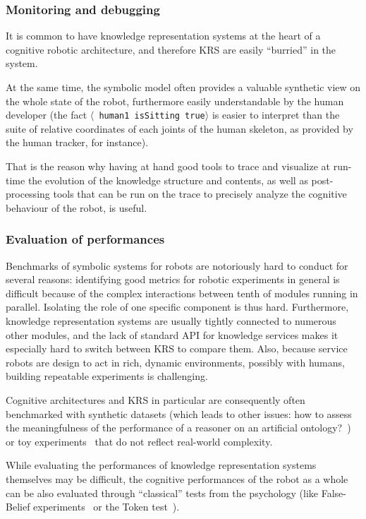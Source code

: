 \documentclass[a4paper, twocolumn]{article}
\newcommand{\stmt}[1]{{\footnotesize \tt $\langle$ #1\relax$\rangle$}}
\begin{document}
\subsubsection{Monitoring and debugging}
\label{sect|debugging}

It is common to have knowledge representation systems at the heart of a
cognitive robotic architecture, and therefore KRS are easily ``burried'' in the
system.

At the same time, the symbolic model often provides a valuable synthetic view
on the whole state of the robot, furthermore easily understandable by the human
developer (the fact \stmt{human1 isSitting true} is easier to interpret than
the suite of relative coordinates of each joints of the human skeleton, as
provided by the human tracker, for instance).

That is the reason why having at hand good tools to trace and visualize at
run-time the evolution of the knowledge structure and contents, as well as
post-processing tools that can be run on the trace to precisely analyze the
cognitive behaviour of the robot, is useful.

\subsubsection{Evaluation of performances}
\label{sect|performances}

Benchmarks of symbolic systems for robots are notoriously hard to conduct for
several reasons: identifying good metrics for robotic experiments in general is
difficult because of the complex interactions between tenth of modules running
in parallel. Isolating the role of one specific component is thus hard.
Furthermore, knowledge representation systems are usually tightly connected to
numerous other modules, and the lack of standard API for knowledge services
makes it especially hard to switch between KRS to compare them. Also, because
service robots are design to act in rich, dynamic environments, possibly with
humans, building repeatable experiments is challenging.

Cognitive architectures and KRS in particular are consequently often
benchmarked with synthetic datasets (which leads to other issues: how to assess
the meaningfulness of the performance of a reasoner on an artificial
ontology?~\cite{Bail2010}) or toy experiments~\cite{Chong2009} that do
not reflect real-world complexity.

While evaluating the performances of knowledge representation systems
themselves may be difficult, the cognitive performances of the robot as a whole
can be also evaluated through ``classical'' tests from the psychology (like
False-Belief experiments~\cite{Leslie2000} or the Token
test~\cite{DiSimoni1978}).
\end{document}
